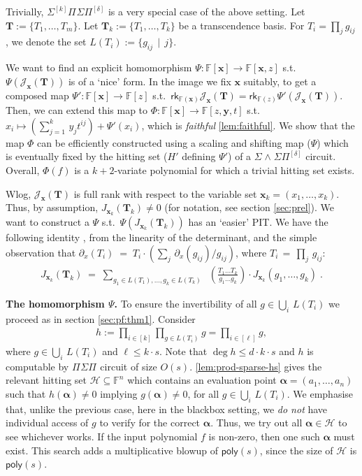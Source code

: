 \documentclass[10pt,a4paper]{article}
\newcommand{\poly}{\mathsf{poly}}
\newcommand{\F}{\mathbb{F}}
\newcommand{\x}{{\boldsymbol x}}
\newcommand{\alphavec}{\boldsymbol \alpha}
\newcommand{\T}{{\boldsymbol T}}
\newcommand{\y}{{\boldsymbol y}}
\newcommand{\calH}{\mathcal{H}}
\newcommand{\calJ}{\mathcal{J}}
\newcommand{\rk}{\mathsf{rk}}
\newcommand{\PSP}[2]{\Pi^{#1}\Sigma\Pi^{#2}}
\newcommand{\SPSP}[3]{\Sigma^{#1}\Pi^{#2}\Sigma\Pi^{#3}}
\newcommand{\SWSP}[3]{\Sigma^{#1}\!\wedge^{#2}\!\Sigma\Pi^{#3}}
\numberwithin{equation}{section}
\begin{document}
Trivially, $\SPSP{[k]}{}{[\delta]}$ is a very special case of the above setting. Let $\T:=\{T_1,\hdots,T_m\}$. Let $\T_{k}:=\{T_1,\hdots,T_k\}$ be a transcendence basis. For $T_i=\prod_{j} g_{ij}$, we denote the set $L(T_i):=\{g_{ij}\,\mid\,j\}$. 

We want to find an explicit homomorphism $\Psi : \F[\x] \to \F[\x,z]$ s.t.~$\Psi(\calJ_{\x}(\T))$ is of a `nice' form. In the image we fix $\x$ suitably, to get a composed map $\Psi' : \F[\x] \longrightarrow \F[z]$ s.t.~$\rk_{\F(\x)}\calJ_{\x}(\T) = \rk_{\F(z)}\Psi'(\calJ_{\x}(\T))$. Then, we can extend this map to $\Phi : \F[\x] \longrightarrow \F[z,\y,t]$ s.t.~$x_i \mapsto (\sum_{j=1}^k\,y_jt^{ij}) + \Psi'(x_i)$, which is \emph{faithful} \autoref{lem:faithful}. We show that the map $\Phi$ can be efficiently constructed using a scaling and shifting map ($\Psi$) which is eventually fixed by the hitting set ($H'$ defining $\Psi'$) of a $\SWSP{}{}{[\delta]}$ circuit. Overall, $\Phi(f)$ is a $k+2$-variate polynomial for which a trivial hitting set exists.

Wlog, $\calJ_{\x}(\T)$ is full rank with respect to the variable set $\x_{k}=(x_1,\hdots,x_k)$. Thus, by assumption, $J_{{\x}_k}(\T_k) \ne 0$ (for notation, see section \ref{sec:prel}). We want to construct a $\Psi$ s.t.~$\Psi(J_{{\x}_k}(\T_k))$ has an `easier' PIT. We have the following identity \cite[Eqn.~3.1]{agrawal2016jacobian}, from the linearity of the determinant, and the simple observation that $\partial_{x}(T_i) \;=\; T_i \cdot \left(\sum_{j}\,\partial_{x}(g_{ij})/g_{ij}\right)$, where $T_i\,=\,\prod_{j}\,g_{ij} $:
\begin{align}
    J_{{\x}_k}(\T_k)\;=\;\sum_{g_1 \in L(T_1) , \hdots , g_k \in L(T_k)}\;\; \left( \frac{T_1\hdots T_k}{g_1 \hdots g_k}\right) \cdot J_{{\x}_k}(g_1,\hdots,g_k)\;. \label{jacobian-main-eq}
\end{align}

\textbf{The homomorphism $\Psi$.} To ensure the invertibility of all $g \in \bigcup_{i}\,L(T_i)$ we proceed as in section \ref{sec:pf:thm1}. Consider 
\begin{align*}
    h := \prod_{i \in [k]} \prod_{g \in L(T_i)} g = \prod_{i \in [\ell]} g,
\end{align*}
where $g \in \bigcup_{i}\,L(T_i)$ and $\ell \leq k \cdot s$. Note that $\deg h \leq d \cdot k \cdot s$ and $h$ is computable by $\PSP{}{}$ circuit of size $O(s)$. \autoref{lem:prod-sparse-hs} gives the relevant hitting set $\calH \subseteq \F^n$ which contains an evaluation point $\alphavec = (a_1, \dots, a_n)$ such that $h(\alphavec) \neq 0$ implying $g(\alphavec) \neq 0$, for all $g \in \bigcup_{i}\,L(T_i)$. We emphasise that, unlike the previous case, here in the blackbox setting, we {\em do not} have individual access of $g$ to verify for the correct $\alphavec$. Thus, we try out all $\alphavec \in \calH$ to see whichever works. If the input polynomial $f$ is non-zero, then one such $\alphavec$ must exist. This search adds a multiplicative blowup of $\poly(s)$, since the size of $\calH$ is $\poly(s)$. 
\end{document}
